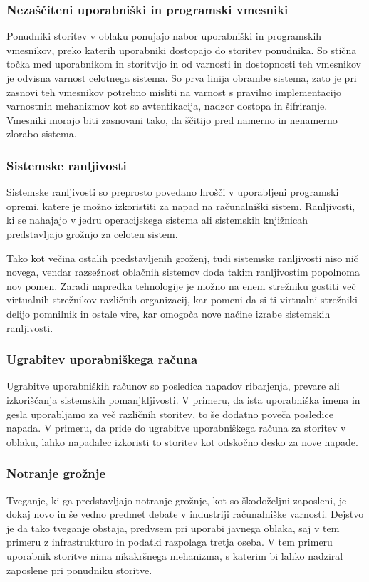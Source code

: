 \documentclass[12pt,a4paper,openany]{book}
\begin{document}
\subsubsection{Nezaščiteni uporabniški in programski vmesniki}
Ponudniki storitev v oblaku ponujajo nabor uporabniški in programskih vmesnikov, preko katerih uporabniki dostopajo do storitev ponudnika. So stična točka med uporabnikom in storitvijo in od varnosti in dostopnosti teh vmesnikov je odvisna varnost celotnega sistema. So prva linija obrambe sistema, zato je pri zasnovi teh vmesnikov potrebno misliti na varnost s pravilno implementacijo varnostnih mehanizmov kot so avtentikacija, nadzor dostopa in šifriranje. Vmesniki morajo biti zasnovani tako, da ščitijo pred namerno in nenamerno zlorabo sistema.

\subsubsection{Sistemske ranljivosti}
Sistemske ranljivosti so preprosto povedano hrošči v uporabljeni programski opremi, katere je možno izkoristiti za napad na računalniški sistem. Ranljivosti, ki se nahajajo v jedru operacijskega sistema ali sistemskih knjižnicah predstavljajo grožnjo za celoten sistem.

Tako kot večina ostalih predstavljenih groženj, tudi sistemske ranljivosti niso nič novega, vendar razsežnost oblačnih sistemov doda takim ranljivostim popolnoma nov pomen. Zaradi napredka tehnologije je možno na enem strežniku gostiti več virtualnih strežnikov različnih organizacij, kar pomeni da si ti virtualni strežniki delijo pomnilnik in ostale vire, kar omogoča nove načine izrabe sistemskih ranljivosti.

\subsubsection{Ugrabitev uporabniškega računa}
Ugrabitve uporabniških računov so posledica napadov ribarjenja, prevare ali izkoriščanja sistemskih pomanjkljivosti. V primeru, da ista uporabniška imena in gesla uporabljamo za več različnih storitev, to še dodatno poveča posledice napada. V primeru, da pride do ugrabitve uporabniškega računa za storitev v oblaku, lahko napadalec izkoristi to storitev kot odskočno desko za nove napade.

\subsubsection{Notranje grožnje}
Tveganje, ki ga predstavljajo notranje grožnje, kot so škodoželjni zaposleni, je dokaj novo in še vedno predmet debate v industriji računalniške varnosti. Dejstvo je da tako tveganje obstaja, predvsem pri uporabi javnega oblaka, saj v tem primeru z infrastrukturo in podatki razpolaga tretja oseba. V tem primeru uporabnik storitve nima nikakršnega mehanizma, s katerim bi lahko nadziral zaposlene pri ponudniku storitve.
\end{document}
